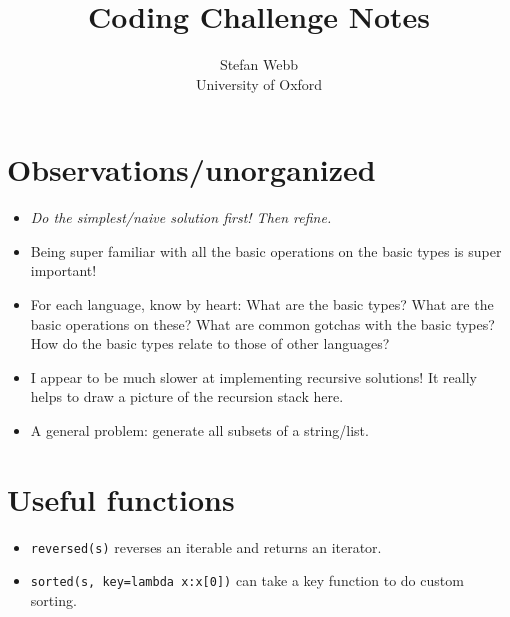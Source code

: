 \documentclass[12pt]{article}
\title{Coding Challenge Notes}
\author{
  Stefan Webb \\
  University of Oxford \\
}
\begin{document}
\lstset{language=Python,xleftmargin=12pt,basicstyle=\ttfamily\footnotesize,aboveskip=-6pt, belowskip=0pt,tabsize=2,breaklines=true}
\newcommand{\python}[1]{\lstinline[columns=fixed]{#1}}

\suppressfloats

\setlength{\abovedisplayskip}{3.5pt}
\setlength{\belowdisplayskip}{3.5pt}
\setlength{\abovedisplayshortskip}{3.5pt}
\setlength{\belowdisplayshortskip}{3.5pt}	

\maketitle

%  

\section{Observations/unorganized}
\begin{itemize}
  \item \emph{Do the simplest/naive solution first! Then refine.}
  \item Being super familiar with all the basic operations on the basic types is super important!
  \item For each language, know by heart: What are the basic types? What are the basic operations on these? What are common gotchas with the basic types? How do the basic types relate to those of other languages?
  \item I appear to be much slower at implementing recursive solutions! It really helps to draw a picture of the recursion stack here.
  \item A general problem: generate all subsets of a string/list.
\end{itemize}

\section{Useful functions}
\begin{itemize}
  \item \python{reversed(s)} reverses an iterable and returns an iterator.
  \item \python{sorted(s, key=lambda x:x[0])} can take a key function to do custom sorting.
\end{itemize}
\end{document}
